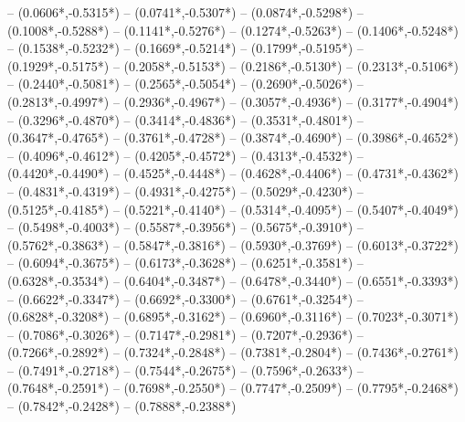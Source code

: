 {	-- ({0.0606*\dx},{-0.5315*\dy})
	-- ({0.0741*\dx},{-0.5307*\dy})
	-- ({0.0874*\dx},{-0.5298*\dy})
	-- ({0.1008*\dx},{-0.5288*\dy})
	-- ({0.1141*\dx},{-0.5276*\dy})
	-- ({0.1274*\dx},{-0.5263*\dy})
	-- ({0.1406*\dx},{-0.5248*\dy})
	-- ({0.1538*\dx},{-0.5232*\dy})
	-- ({0.1669*\dx},{-0.5214*\dy})
	-- ({0.1799*\dx},{-0.5195*\dy})
	-- ({0.1929*\dx},{-0.5175*\dy})
	-- ({0.2058*\dx},{-0.5153*\dy})
	-- ({0.2186*\dx},{-0.5130*\dy})
	-- ({0.2313*\dx},{-0.5106*\dy})
	-- ({0.2440*\dx},{-0.5081*\dy})
	-- ({0.2565*\dx},{-0.5054*\dy})
	-- ({0.2690*\dx},{-0.5026*\dy})
	-- ({0.2813*\dx},{-0.4997*\dy})
	-- ({0.2936*\dx},{-0.4967*\dy})
	-- ({0.3057*\dx},{-0.4936*\dy})
	-- ({0.3177*\dx},{-0.4904*\dy})
	-- ({0.3296*\dx},{-0.4870*\dy})
	-- ({0.3414*\dx},{-0.4836*\dy})
	-- ({0.3531*\dx},{-0.4801*\dy})
	-- ({0.3647*\dx},{-0.4765*\dy})
	-- ({0.3761*\dx},{-0.4728*\dy})
	-- ({0.3874*\dx},{-0.4690*\dy})
	-- ({0.3986*\dx},{-0.4652*\dy})
	-- ({0.4096*\dx},{-0.4612*\dy})
	-- ({0.4205*\dx},{-0.4572*\dy})
	-- ({0.4313*\dx},{-0.4532*\dy})
	-- ({0.4420*\dx},{-0.4490*\dy})
	-- ({0.4525*\dx},{-0.4448*\dy})
	-- ({0.4628*\dx},{-0.4406*\dy})
	-- ({0.4731*\dx},{-0.4362*\dy})
	-- ({0.4831*\dx},{-0.4319*\dy})
	-- ({0.4931*\dx},{-0.4275*\dy})
	-- ({0.5029*\dx},{-0.4230*\dy})
	-- ({0.5125*\dx},{-0.4185*\dy})
	-- ({0.5221*\dx},{-0.4140*\dy})
	-- ({0.5314*\dx},{-0.4095*\dy})
	-- ({0.5407*\dx},{-0.4049*\dy})
	-- ({0.5498*\dx},{-0.4003*\dy})
	-- ({0.5587*\dx},{-0.3956*\dy})
	-- ({0.5675*\dx},{-0.3910*\dy})
	-- ({0.5762*\dx},{-0.3863*\dy})
	-- ({0.5847*\dx},{-0.3816*\dy})
	-- ({0.5930*\dx},{-0.3769*\dy})
	-- ({0.6013*\dx},{-0.3722*\dy})
	-- ({0.6094*\dx},{-0.3675*\dy})
	-- ({0.6173*\dx},{-0.3628*\dy})
	-- ({0.6251*\dx},{-0.3581*\dy})
	-- ({0.6328*\dx},{-0.3534*\dy})
	-- ({0.6404*\dx},{-0.3487*\dy})
	-- ({0.6478*\dx},{-0.3440*\dy})
	-- ({0.6551*\dx},{-0.3393*\dy})
	-- ({0.6622*\dx},{-0.3347*\dy})
	-- ({0.6692*\dx},{-0.3300*\dy})
	-- ({0.6761*\dx},{-0.3254*\dy})
	-- ({0.6828*\dx},{-0.3208*\dy})
	-- ({0.6895*\dx},{-0.3162*\dy})
	-- ({0.6960*\dx},{-0.3116*\dy})
	-- ({0.7023*\dx},{-0.3071*\dy})
	-- ({0.7086*\dx},{-0.3026*\dy})
	-- ({0.7147*\dx},{-0.2981*\dy})
	-- ({0.7207*\dx},{-0.2936*\dy})
	-- ({0.7266*\dx},{-0.2892*\dy})
	-- ({0.7324*\dx},{-0.2848*\dy})
	-- ({0.7381*\dx},{-0.2804*\dy})
	-- ({0.7436*\dx},{-0.2761*\dy})
	-- ({0.7491*\dx},{-0.2718*\dy})
	-- ({0.7544*\dx},{-0.2675*\dy})
	-- ({0.7596*\dx},{-0.2633*\dy})
	-- ({0.7648*\dx},{-0.2591*\dy})
	-- ({0.7698*\dx},{-0.2550*\dy})
	-- ({0.7747*\dx},{-0.2509*\dy})
	-- ({0.7795*\dx},{-0.2468*\dy})
	-- ({0.7842*\dx},{-0.2428*\dy})
	-- ({0.7888*\dx},{-0.2388*\dy})
}
